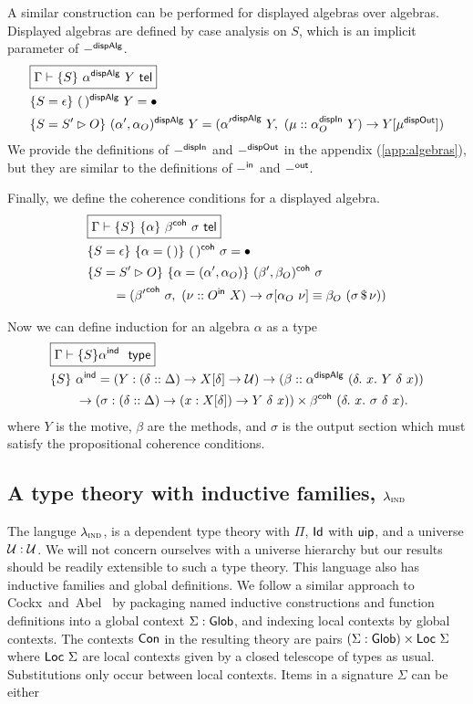 A similar construction can be performed for displayed algebras over algebras.
Displayed algebras are defined by case analysis on $S$, which is an implicit parameter of $-^{\textsf{dispAlg}}$.
\begin{align*}
&\boxed{\Gamma \vdash \{S\}\ \alpha\D\ Y \tel} \\
& \{S = \epsilon\}\ (\,)\D\ Y = \bullet \\
&\{S = S' \rhd O\}\ (\alpha', \alpha_O)\D\ Y = ({\alpha'}\D\ Y,\ (\mu :: \alpha_O\DI\ Y) \to Y[\mu\DO])
\end{align*}
We provide the definitions of $-^{\textsf{dispIn}}$ and $-^{\textsf{dispOut}}$ in the appendix (\cref{app:algebras}), but they are similar to
the definitions of $-^{\textsf{in}}$ and $-^{\textsf{out}}$.

Finally, we define the coherence conditions for a displayed algebra.
\begin{align*}
&\boxed{\Gamma \vdash \{S\}\ \{\alpha\}\ \beta^{\textsf{coh}}\ \sigma \ \textsf{tel}} \\
& \{S = \epsilon\}\ \{\alpha = (\,)\}\ (\,)^{\textsf{coh}}\ \sigma = \bullet \\
& \{S = S' \rhd O\}\ \{\alpha = (\alpha', \alpha_O)\}\ (\beta', \beta_O)^{\textsf{coh}}\ \sigma \\
&\qquad = ({\beta'}^{\textsf{coh}}\ \sigma,\ (\nu :: O^{\textsf{in}}\ X) \to \sigma[\alpha_O\ \nu] \equiv \beta_O\ (\sigma \, \$ \, \nu))
\end{align*}

Now we can define induction for an algebra $\alpha$ as a type
\begin{align*}
&\boxed{\Gamma \vdash \{S\} \alpha\IND\ \type} \\
&\{S\}\ \alpha\IND = (Y : (\delta :: \Delta) \to X[\delta] \to \univ) \to (\beta :: \alpha\D\ (\delta.\ x.\ Y\ \delta\ x)) \\
&\qquad\to (\sigma : (\delta :: \Delta) \to (x : X[\delta]) \to Y\ \delta\ x)) \times \beta\COH\ (\delta.\ x.\ \sigma\ \delta\ x).
\end{align*}
where $Y$ is the motive, $\beta$ are the methods, and $\sigma$ is the output section which must
satisfy the propositional coherence conditions.

\subsection{A type theory with inductive families, $\lambda_{\textsc{ind}}$}\label{sub:lambdaind}

The languge $\lambda_{\textsc{ind}}$, is a dependent type theory with $\Pi$, $\textsf{Id}$ with
$\textsf{uip}$, and a universe $\mathcal{U} : \mathcal{U}$. We will not concern ourselves with a
universe hierarchy but our results should be readily extensible to such a type
theory. This language also has inductive families and global definitions. We
follow a similar approach
to Cockx~and~Abel~\cite{Cockx2018-fk} by packaging named inductive constructions
and function definitions into a global context $\Sigma : \textsf{Glob}$, and indexing local contexts
by global contexts. The contexts $\textsf{Con}$ in the resulting theory are pairs $(\Sigma :
\textsf{Glob}) \times \textsf{Loc}\ \Sigma$ where $\textsf{Loc}\ \Sigma$ are local contexts given by a
closed telescope of types as usual. Substitutions only occur between local contexts.
Items in a signature $\Sigma$ can be either

